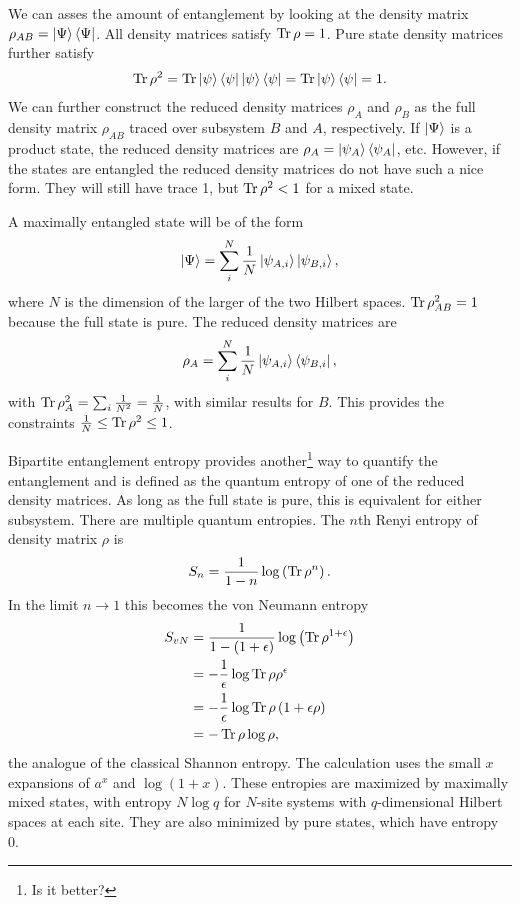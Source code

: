 We can asses the amount of entanglement by looking at the density matrix $\rho_{AB} = \left|\Psi\right\rangle\left\langle\Psi\right|$. All density matrices satisfy $\operatorname{Tr} \rho = 1$. Pure state density matrices further satisfy 
\begin{align}
\operatorname{Tr} \rho^2 = \operatorname{Tr}\left|\psi\right\rangle\left\langle\psi\right|\left|\psi\right\rangle\left\langle\psi\right| = \operatorname{Tr}\left|\psi\right\rangle\left\langle\psi\right| = 1.
\end{align}
We can further construct the reduced density matrices $\rho_A$ and $\rho_B$ as the full density matrix $\rho_{AB}$ traced over subsystem $B$ and $A$, respectively. If $\left|\Psi\right\rangle$ is a product state, the reduced density matrices are $\rho_A = \left|\psi_A\right\rangle\left\langle\psi_A\right|$, etc. However, if the states are entangled the reduced density matrices do not have such a nice form. They will still have trace 1, but $\operatorname{Tr}\rho^2<1$ for a mixed state.

A maximally entangled state will be of the form
\begin{align}
\left|\Psi\right\rangle = \sum_i^N\frac{1}{N}\left|\psi_{A,i}\right\rangle\left|\psi_{B,i}\right\rangle,
\end{align}
where $N$ is the dimension of the larger of the two Hilbert spaces. $\operatorname{Tr}\rho_{AB}^2=1$ because the full state is pure. The reduced density matrices are
\begin{align}
\rho_A = \sum_i^N\frac{1}{N}\left|\psi_{A,i}\right\rangle\left\langle\psi_{B,i}\right|,
\end{align}
with $\operatorname{Tr}\rho_A^2 = \sum_i\frac{1}{N^2}=\frac{1}{N}$, with similar results for $B$. This provides the constraints $\frac{1}{N}\le\operatorname{Tr}\rho^2\le 1$. 

Bipartite entanglement entropy provides another\footnote{Is it better?} way to quantify the entanglement and is defined as the quantum entropy of one of the reduced density matrices. As long as the full state is pure, this is equivalent for either subsystem. There are multiple quantum entropies. The $n$th Renyi entropy of density matrix $\rho$ is 
\begin{align}
S_n = \frac{1}{1-n}\log\left(\operatorname{Tr}\rho^n\right). \label{eqn:renyi}
\end{align}
In the limit $n\to1$ this becomes the von Neumann entropy 
\begin{align}
S_{vN} &= \frac{1}{1-(1+\epsilon)}\log\left(\operatorname{Tr}\rho^{1+\epsilon}\right) \nonumber\\
&= -\frac{1}{\epsilon}\log \operatorname{Tr} \rho \rho^{\epsilon}\nonumber\\
&= -\frac{1}{\epsilon}\log\operatorname{Tr}\rho\left(1+\epsilon\rho\right) \nonumber\\
&= -\operatorname{Tr}\rho\log\rho,
\end{align}
the analogue of the classical Shannon entropy. The calculation uses the small $x$ expansions of $a^x$ and $\log(1+x)$. These entropies are maximized by maximally mixed states, with entropy $N\log q$ for $N$-site systems with $q$-dimensional Hilbert spaces at each site. They are also minimized by pure states, which have entropy 0.

